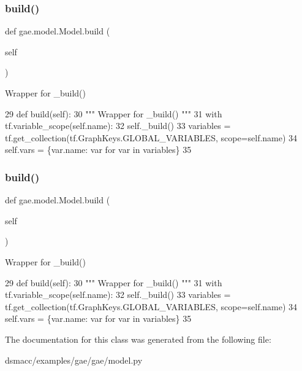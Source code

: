 \subsubsection{\texorpdfstring{build()}{build()}\hspace{0.1cm}{\footnotesize\ttfamily [2/3]}}
{\footnotesize\ttfamily def gae.\+model.\+Model.\+build (\begin{DoxyParamCaption}\item[{}]{self }\end{DoxyParamCaption})}

\begin{DoxyVerb}Wrapper for _build() \end{DoxyVerb}
 
\begin{DoxyCode}
29     \textcolor{keyword}{def }build(self):
30         \textcolor{stringliteral}{""" Wrapper for \_build() """}
31         with tf.variable\_scope(self.name):
32             self.\_build()
33         variables = tf.get\_collection(tf.GraphKeys.GLOBAL\_VARIABLES, scope=self.name)
34         self.vars = \{var.name: var \textcolor{keywordflow}{for} var \textcolor{keywordflow}{in} variables\}
35 
\end{DoxyCode}
\mbox{\label{classgae_1_1model_1_1Model_a04510784ad07bd7f15e3798f2730700a}} 
\subsubsection{\texorpdfstring{build()}{build()}\hspace{0.1cm}{\footnotesize\ttfamily [3/3]}}
{\footnotesize\ttfamily def gae.\+model.\+Model.\+build (\begin{DoxyParamCaption}\item[{}]{self }\end{DoxyParamCaption})}

\begin{DoxyVerb}Wrapper for _build() \end{DoxyVerb}
 
\begin{DoxyCode}
29     \textcolor{keyword}{def }build(self):
30         \textcolor{stringliteral}{""" Wrapper for \_build() """}
31         with tf.variable\_scope(self.name):
32             self.\_build()
33         variables = tf.get\_collection(tf.GraphKeys.GLOBAL\_VARIABLES, scope=self.name)
34         self.vars = \{var.name: var \textcolor{keywordflow}{for} var \textcolor{keywordflow}{in} variables\}
35 
\end{DoxyCode}


The documentation for this class was generated from the following file\+:\begin{DoxyCompactItemize}
\item 
dsmacc/examples/gae/gae/model.\+py\end{DoxyCompactItemize}
